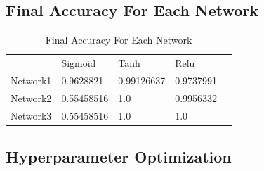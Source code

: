 \documentclass{article}
\begin{document}
\subsection{Final Accuracy For Each Network}

\begin{table}[H]
\centering
\caption{Final Accuracy For Each Network}
\begin{tabular}{|l|l|l|l|l}
\cline{1-4}
         & Sigmoid    & Tanh      & Relu      &  \\ \cline{1-4}
Network1 & 0.9628821   & 0.99126637 & 0.9737991 &  \\ \cline{1-4}
Network2 & 0.55458516 & 1.0       & 0.9956332  &  \\ \cline{1-4}
Network3 & 0.55458516  & 1.0       & 1.0 &  \\ \cline{1-4}
\end{tabular}
\end{table}

\subsection{Hyperparameter Optimization}
\end{document}

